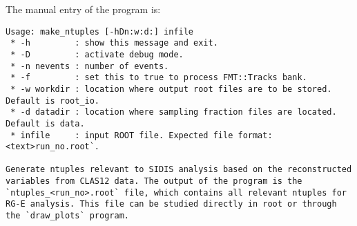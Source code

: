     The manual entry of the program is:
    \begin{lstlisting}
Usage: make_ntuples [-hDn:w:d:] infile
 * -h         : show this message and exit.
 * -D         : activate debug mode.
 * -n nevents : number of events.
 * -f         : set this to true to process FMT::Tracks bank.
 * -w workdir : location where output root files are to be stored. Default is root_io.
 * -d datadir : location where sampling fraction files are located. Default is data.
 * infile     : input ROOT file. Expected file format: <text>run_no.root`.

Generate ntuples relevant to SIDIS analysis based on the reconstructed variables from CLAS12 data. The output of the program is the `ntuples_<run_no>.root` file, which contains all relevant ntuples for RG-E analysis. This file can be studied directly in root or through the `draw_plots` program.
    \end{lstlisting}